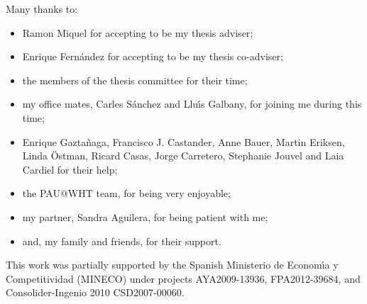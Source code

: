 Many thanks to:
\begin{itemize}
\item Ramon Miquel for accepting to be my thesis adviser;

\item Enrique Fern\'andez for accepting to be my thesis co-adviser;

\item the members of the thesis committee for their time;

\item my office mates, Carles S\'anchez and Llu\'{\i}s Galbany, for joining me during this time;

\item Enrique Gazta\~naga, Francisco J. Castander, Anne Bauer, Martin Eriksen, Linda \"Ostman, Ricard Casas, Jorge Carretero, Stephanie Jouvel and Laia Cardiel for their help;

\item the PAU@WHT team, for being very enjoyable;

\item my partner, Sandra Aguilera, for being patient with me;

\item and, my family and friends, for their support.
\end{itemize}

This work was partially supported by the Spanish Ministerio de Econom\'{\i}a y Com\-pe\-ti\-ti\-vi\-dad (MINECO) under projects AYA2009-13936, FPA2012-39684, and Consolider-Ingenio 2010 CSD2007-00060.
